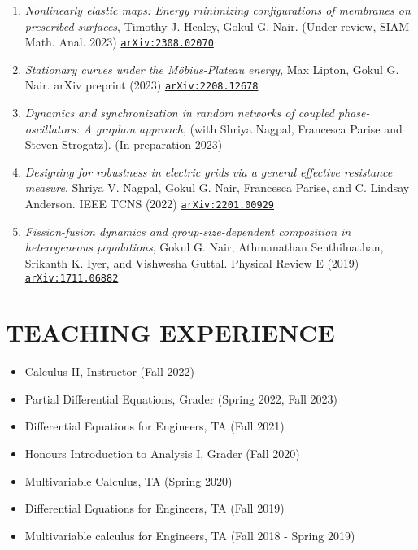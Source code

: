 \documentclass[margin]{res} %
\begin{document}
\begin{resume}
\begin{enumerate}
	\item {\sl Nonlinearly elastic maps: Energy minimizing configurations of membranes on prescribed surfaces}, Timothy J. Healey, Gokul G. Nair. (Under review, SIAM Math. Anal. 2023) \href{https://arxiv.org/abs/2308.02070}{\texttt{arXiv:2308.02070}} 
	
	\item {\sl Stationary curves under the M\"obius-Plateau energy}, Max Lipton, Gokul G. Nair. arXiv preprint (2023) \href{https://arxiv.org/abs/2208.12678}{\texttt{arXiv:2208.12678}} 
	
	\item {\sl Dynamics and synchronization in random networks of coupled phase-oscillators: A graphon approach}, (with Shriya Nagpal, Francesca Parise and Steven Strogatz). (In preparation 2023)
	
	\item {\sl Designing for robustness in electric grids via a general effective resistance measure}, Shriya V. Nagpal, Gokul G. Nair, Francesca Parise, and C. Lindsay Anderson. IEEE TCNS (2022) \href{https://arxiv.org/abs/2201.00929}{\texttt{arXiv:2201.00929}}
	
	\item {\sl Fission-fusion dynamics and group-size-dependent composition in heterogeneous populations}, Gokul G. Nair, Athmanathan Senthilnathan, Srikanth K. Iyer, and Vishwesha Guttal. Physical Review E (2019) \href{https://arxiv.org/abs/1711.06882}{\texttt{arXiv:1711.06882}}
\end{enumerate}

\section{TEACHING EXPERIENCE}

\begin{itemize}
	\item Calculus II, Instructor (Fall 2022)
	\item Partial Differential Equations, Grader (Spring 2022, Fall 2023)
	\item Differential Equations for Engineers, TA (Fall 2021)
	\item Honours Introduction to Analysis I, Grader (Fall 2020)
	\item Multivariable Calculus, TA (Spring 2020)
	\item Differential Equations for Engineers, TA (Fall 2019)
	\item Multivariable calculus for Engineers, TA (Fall 2018 - Spring 2019)
\end{itemize}


\end{resume}
\end{document}

